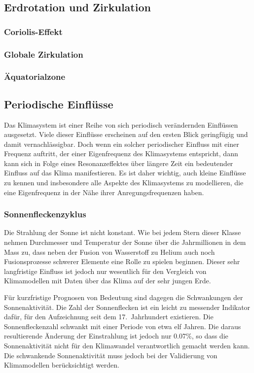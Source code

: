 \subsection{Erdrotation und Zirkulation}
\subsubsection{Coriolis-Effekt}
\subsubsection{Globale Zirkulation}
\subsubsection{Äquatorialzone}

\subsection{Periodische Einflüsse}
Das Klimasystem ist einer Reihe von sich periodisch verändernden 
Einflüssen ausgesetzt.
Viele dieser Einflüsse erscheinen auf den ersten Blick geringfügig
und damit vernachlässigbar.
Doch wenn ein solcher periodischer Einfluss mit einer Frequenz auftritt,
der einer Eigenfrequenz des Klimasystems entspricht, dann kann sich 
in Folge eines Resonanzeffektes über längere Zeit ein bedeutender 
Einfluss auf das Klima manifestieren.
Es ist daher wichtig, auch kleine Einflüsse zu kennen und insbesondere
alle Aspekte des Klimasystems zu modellieren, die eine Eigenfrequenz
in der Nähe ihrer Anregungsfrequenzen haben.

\subsubsection{Sonnenfleckenzyklus}
Die Strahlung der Sonne ist nicht konstant.
Wie bei jedem Stern dieser Klasse nehmen Durchmesser und Temperatur der
Sonne über die Jahrmillionen in dem Mass zu, dass neben der Fusion
von Wasserstoff zu Helium auch noch Fusionsprozesse schwerer Elemente
eine Rolle zu spielen beginnen.
Dieser sehr langfristige Einfluss ist jedoch nur wesentlich für
den Vergleich von Klimamodellen mit Daten über das Klima auf der sehr
jungen Erde.

Für kurzfristige Prognosen von Bedeutung sind dagegen die Schwankungen
der Sonnenaktivität.
Die Zahl der Sonnenflecken ist ein leicht zu messender Indikator
dafür, für den Aufzeichnung seit dem 17.~Jahrhundert existieren.
Die Sonnenfleckenzahl schwankt mit einer Periode von etwa elf Jahren.
Die daraus resultierende Änderung der Einstrahlung ist jedoch nur 0.07\%,
so dass die Sonnenaktivität nicht für den Klimawandel verantwortlich
gemacht werden kann. 
Die schwankende Sonnenaktivität muss jedoch bei der Validierung
von Klimamodellen berücksichtigt werden.

